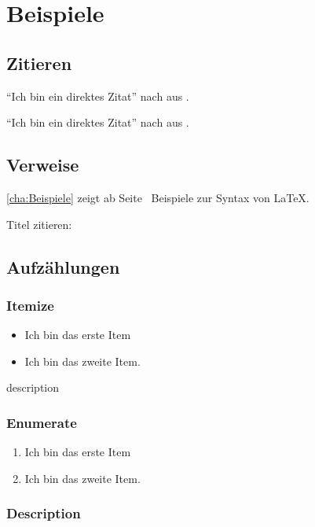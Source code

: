 \chapter{Beispiele}
\label{cha:Beispiele}

\section{Zitieren}

\enquote{Ich bin ein direktes Zitat} nach \citeauthor{Nachname.2013} aus \cite[42]{.2000}.

\enquote{Ich bin ein direktes Zitat} nach \citeauthor{Glover.2006} aus \cite[42]{Glover.2006}.
\section{Verweise}

\autoref{cha:Beispiele} zeigt ab Seite~\pageref{cha:Beispiele} Beispiele zur Syntax von \LaTeX{}.

Titel zitieren: 

\section{Aufzählungen}
\label{sec:Aufzaehlungen}

\subsection{Itemize}

\begin{itemize}
	\item
		Ich bin das erste Item
	\item
		Ich bin das zweite Item.
\end{itemize}description

\subsection{Enumerate}

\begin{enumerate}
	\item
		Ich bin das erste Item
	\item
		Ich bin das zweite Item.
\end{enumerate}

\subsection{Description}

